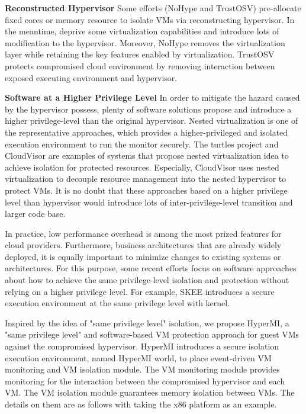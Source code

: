 \documentclass[conference]{IEEEtran}
\begin{document}
\textbf{Reconstructed Hypervisor }
Some efforts (NoHype\cite{NoHype} and TrustOSV\cite{TrustOSV}) pre-allocate fixed cores or memory resource to isolate VMs via reconstructing hypervisor. In the meantime, deprive some virtualization capabilities and introduce lots of modification to the hypervisor. Moreover, NoHype removes the virtualization layer while retaining the key features enabled by virtualization. TrustOSV protects compromised cloud environment by removing interaction between exposed executing environment and hypervisor.

 
\textbf{Software at a Higher Privilege Level}
In order to mitigate the hazard caused by the hypervisor possess, plenty of software solutions propose and introduce a higher privilege-level than the original hypervisor. Nested virtualization is one of the representative approaches, which provides a higher-privileged and isolated execution environment to run the monitor securely. The turtles project \cite{Ben2007The} and CloudVisor \cite{Zhang2011CloudVisor} are examples of systems that propose nested virtualization idea to achieve isolation for protected resources. Especially, CloudVisor uses nested virtualization to decouple resource management into the nested hypervisor to protect VMs. It is no doubt that these approaches based on a higher privilege level than hypervisor would introduce lots of inter-privilege-level transition and larger code base.

In practice, low performance overhead is among the most prized features for cloud providers. Furthermore, business architectures that are already widely deployed, it is equally important to minimize changes to existing systems or architectures. For this purpose,
some recent efforts focus on software approaches about how to achieve the same privilege-level isolation and protection without relying on a higher privilege level. For example, SKEE\cite{Azab2016SKEE} introduces a secure execution environment at the same privilege level with kernel. 

Inspired by the idea of "same privilege level" isolation, we propose HyperMI, a "same privilege level" and software-based VM protection approach for guest VMs against the compromised hypervisor. HyperMI introduces a secure isolation execution environment, named HyperMI world, to place event-driven VM monitoring and VM isolation module. 
The VM monitoring module provides monitoring for the interaction between the compromised hypervisor and each VM. 
The VM isolation module guarantees memory isolation between VMs.  The details on them are as follows with taking the x86 platform as an example.
\end{document}
